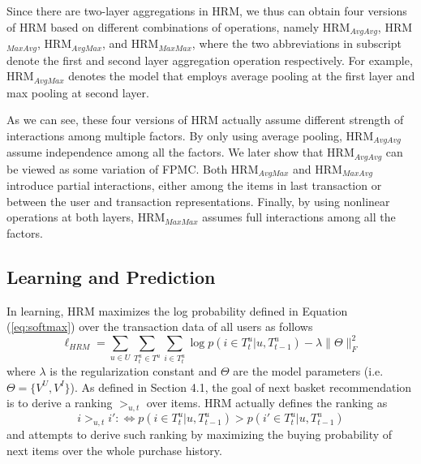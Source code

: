 \documentclass[10pt,journal,compsoc]{IEEEtran}
\begin{document}
Since there are two-layer aggregations in HRM, we thus can obtain four versions of HRM based on different combinations of operations, namely HRM$_{AvgAvg}$, HRM$_{MaxAvg}$, HRM$_{AvgMax}$, and HRM$_{MaxMax}$, where the two abbreviations in subscript denote the first and second layer aggregation operation respectively. For example, HRM$_{AvgMax}$ denotes the model that employs average pooling at the first layer and max pooling at second layer.

As we can see, these four versions of HRM actually assume different strength of interactions among multiple factors. By only using average pooling, HRM$_{AvgAvg}$ assume independence among all the factors. We later show that HRM$_{AvgAvg}$ can be viewed as some variation of FPMC. Both HRM$_{AvgMax}$ and HRM$_{MaxAvg}$ introduce partial interactions, either among the items in last transaction or between the user and transaction representations. Finally, by using nonlinear operations at both layers, HRM$_{MaxMax}$ assumes full interactions among all the factors.

\subsection{Learning and Prediction}
In learning, HRM maximizes the log probability defined in Equation (\ref{eq:softmax}) over the transaction data of all users as follows
\begin{displaymath}
\ell_{HRM} = \sum_{u\in U}\sum_{T^u_t\in T^u} \sum_{i\in T^u_t}\log p(i\in T^u_t|u,T^u_{t-1}) -\lambda\|\Theta\|^2_F
\end{displaymath}
where $\lambda$ is the regularization constant and $\Theta$ are the model parameters (i.e.~$\Theta\!\!=\!\!\{V^U\!,\!V^I\}$). As defined in Section 4.1, the goal of next basket recommendation is to derive a ranking $>_{u,t}$ over items. HRM actually defines the ranking as
\begin{displaymath}
i>_{u,t}i' :\Leftrightarrow p(i\in T^u_t|u,T^u_{t-1}) > p(i'\in T^u_t|u,T^u_{t-1})
\end{displaymath}
and attempts to derive such ranking by maximizing the buying probability of next items over the whole purchase history.
\end{document}
